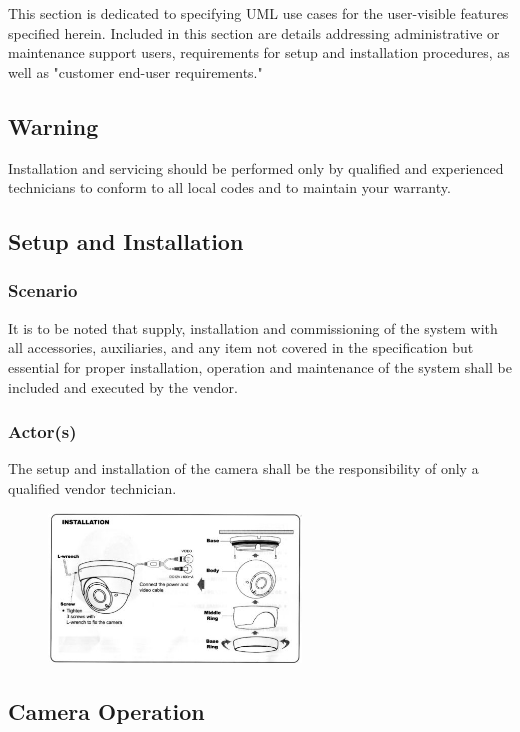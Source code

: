 This section is dedicated to specifying UML use cases for the user-visible features specified herein. Included in this section are details addressing administrative or maintenance support users, requirements for setup and installation procedures, as well as "customer end-user requirements."

\subsection{Warning}
Installation and servicing should be performed only by qualified and experienced technicians to conform to all local codes and to maintain your warranty.

\subsection{Setup and Installation}

\subsubsection{Scenario}
It is to be noted that supply, installation and commissioning of the system with all accessories, auxiliaries, and any item not covered in the specification but essential for proper installation, operation and maintenance of the system shall be included and executed by the vendor.

\subsubsection{Actor(s)}
The setup and installation of the camera shall be the responsibility of only a qualified vendor technician.
\vspace{0.5 in}
\begin{figure}[h!]
	\centering
   	\includegraphics[width=0.60\textwidth]{images/Installation-Diagram}
\end{figure}
\vspace{0.5 in}
\subsection{Camera Operation}

